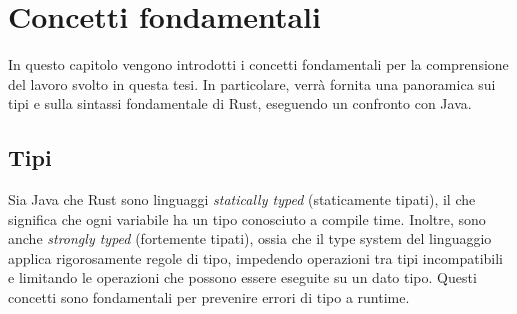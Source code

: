 
\chapter{Concetti fondamentali}
In questo capitolo vengono introdotti i concetti fondamentali per la comprensione del lavoro svolto in questa tesi. In particolare, verrà fornita una panoramica sui tipi e sulla sintassi fondamentale di Rust, eseguendo un confronto con Java. 
\section{Tipi}
Sia Java che Rust sono linguaggi \textit{statically typed} (staticamente tipati), il che significa che ogni variabile ha un tipo conosciuto a compile time. Inoltre, sono anche \textit{strongly typed} (fortemente tipati), ossia che il type system del linguaggio applica rigorosamente regole di tipo, impedendo operazioni tra tipi incompatibili e limitando le operazioni che possono essere eseguite su un dato tipo. Questi concetti sono fondamentali per prevenire errori di tipo a runtime.


